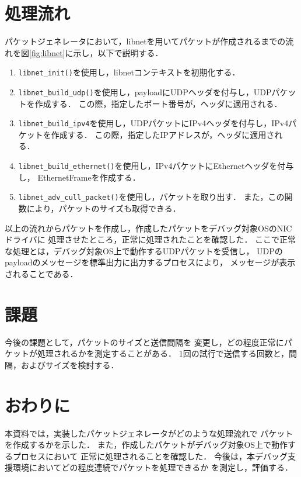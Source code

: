 \documentclass[12pt]{jsarticle}
\begin{document}
\section{処理流れ}
パケットジェネレータにおいて，libnetを用いてパケットが作成されるまでの流れを図\ref{fig:libnet}に示し，以下で説明する．
\begin{enumerate}
    \item {\tt libnet\_init()}を使用し，libnetコンテキストを初期化する．
    \item {\tt libnet\_build\_udp()}を使用し，payloadにUDPヘッダを付与し，UDPパケットを作成する．
        この際，指定したポート番号が，ヘッダに適用される．
    \item {\tt libnet\_build\_ipv4}を使用し，UDPパケットにIPv4ヘッダを付与し，IPv4パケットを作成する．
        この際，指定したIPアドレスが，ヘッダに適用される．
    \item {\tt libnet\_build\_ethernet()}を使用し，IPv4パケットにEthernetヘッダを付与し，
        EthernetFrameを作成する．
    \item {\tt libnet\_adv\_cull\_packet()}を使用し，パケットを取り出す．
        また，この関数により，パケットのサイズも取得できる．
\end{enumerate}
以上の流れからパケットを作成し，作成したパケットをデバッグ対象OSのNICドライバに
処理させたところ，正常に処理されたことを確認した．
ここで正常な処理とは，デバッグ対象OS上で動作するUDPパケットを受信し，
UDPのpayloadのメッセージを標準出力に出力するプロセスにより，
メッセージが表示されることである．
\section{課題}
今後の課題として，パケットのサイズと送信間隔を
変更し，どの程度正常にパケットが処理されるかを測定することがある．
1回の試行で送信する回数と，間隔，およびサイズを検討する．
\section{おわりに}
本資料では，実装したパケットジェネレータがどのような処理流れで
パケットを作成するかを示した．
また，作成したパケットがデバッグ対象OS上で動作するプロセスにおいて
正常に処理されることを確認した．
今後は，本デバッグ支援環境においてどの程度連続でパケットを処理できるか
を測定し，評価する．
\end{document}

